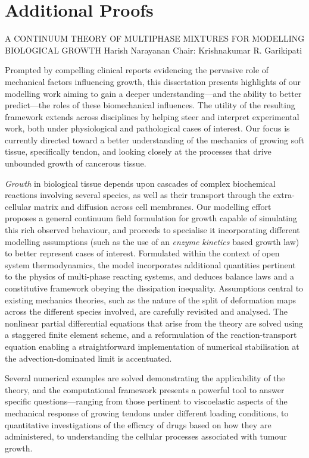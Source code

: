 \documentclass[leqno]{report}
\begin{document}
\startappendices
\chapter{Additional Proofs}
\label{additional-proofs}




\startabstractpage
{A CONTINUUM THEORY OF MULTIPHASE MIXTURES FOR
  MODELLING BIOLOGICAL GROWTH} {Harish Narayanan} {Chair: Krishnakumar R. Garikipati}

Prompted by compelling clinical reports evidencing the pervasive role
of mechanical factors influencing growth, this dissertation presents
highlights of our modelling work aiming to gain a deeper
understanding---and the ability to better predict---the roles of these
biomechanical influences. The utility of the resulting framework
extends across disciplines by helping steer and interpret experimental
work, both under physiological and pathological cases of interest. Our
focus is currently directed toward a better understanding of the
mechanics of growing soft tissue, specifically tendon, and looking
closely at the processes that drive unbounded growth of cancerous
tissue.

{\em Growth} in biological tissue depends upon cascades of complex
biochemical reactions involving several species, as well as their
transport through the extra-cellular matrix and diffusion across cell
membranes. Our modelling effort proposes a general continuum field
formulation for growth capable of simulating this rich observed
behaviour, and proceeds to specialise it incorporating different
modelling assumptions (such as the use of an {\sl enzyme kinetics}
based growth law) to better represent cases of interest. Formulated
within the context of open system thermodynamics, the model
incorporates additional quantities pertinent to the physics of
multi-phase reacting systems, and deduces balance laws and a
constitutive framework obeying the dissipation inequality. Assumptions
central to existing mechanics theories, such as the nature of the
split of deformation maps across the different species involved, are
carefully revisited and analysed. The nonlinear partial differential
equations that arise from the theory are solved using a staggered
finite element scheme, and a reformulation of the reaction-transport
equation enabling a straightforward implementation of numerical
stabilisation at the advection-dominated limit is accentuated.

Several numerical examples are solved demonstrating the applicability
of the theory, and the computational framework presents a powerful
tool to answer specific questions---ranging from those pertinent to
viscoelastic aspects of the mechanical response of growing tendons
under different loading conditions, to quantitative investigations of
the efficacy of drugs based on how they are administered, to
understanding the cellular processes associated with tumour growth.

\thispagestyle{empty}
\end{document}
